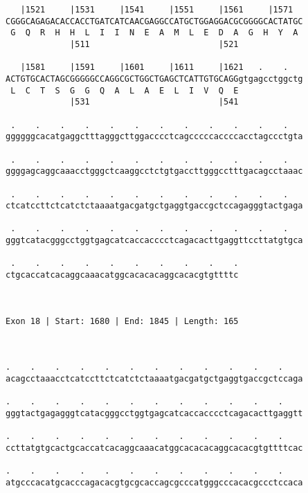 \documentclass{article}
\begin{document}
\begin{Verbatim}
   |1521     |1531     |1541     |1551     |1561     |1571  
CGGGCAGAGACACCACCTGATCATCAACGAGGCCATGCTGGAGGACGCGGGGCACTATGC
 G  Q  R  H  H  L  I  I  N  E  A  M  L  E  D  A  G  H  Y  A 
             |511                          |521             
  
   |1581     |1591     |1601     |1611     |1621   .    .   
ACTGTGCACTAGCGGGGGCCAGGCGCTGGCTGAGCTCATTGTGCAGGgtgagcctggctg
 L  C  T  S  G  G  Q  A  L  A  E  L  I  V  Q  E             
             |531                          |541             
  
 .    .    .    .    .    .    .    .    .    .    .    .   
ggggggcacatgaggctttagggcttggacccctcagcccccaccccacctagccctgta
                                                            
 .    .    .    .    .    .    .    .    .    .    .    .   
ggggagcaggcaaacctgggctcaaggcctctgtgaccttgggcctttgacagcctaaac
                                                            
 .    .    .    .    .    .    .    .    .    .    .    .   
ctcatccttctcatctctaaaatgacgatgctgaggtgaccgctccagagggtactgaga
                                                            
 .    .    .    .    .    .    .    .    .    .    .    .   
gggtcatacgggcctggtgagcatcaccacccctcagacacttgaggttccttatgtgca
                                                            
 .    .    .    .    .    .    .    .    .    .
ctgcaccatcacaggcaaacatggcacacacaggcacacgtgttttc
                                               
                                               
 
Exon 18 | Start: 1680 | End: 1845 | Length: 165



.    .    .    .    .    .    .    .    .    .    .    .    
acagcctaaacctcatccttctcatctctaaaatgacgatgctgaggtgaccgctccaga
                                                            
.    .    .    .    .    .    .    .    .    .    .    .    
gggtactgagagggtcatacgggcctggtgagcatcaccacccctcagacacttgaggtt
                                                            
.    .    .    .    .    .    .    .    .    .    .    .    
ccttatgtgcactgcaccatcacaggcaaacatggcacacacaggcacacgtgttttcac
                                                            
.    .    .    .    .    .    .    .    .    .    .    .    
atgcccacatgcacccagacacgtgcgcaccagcgcccatgggcccacacgccctccaca
                                                            

\end{Verbatim}
\end{document}
